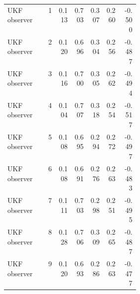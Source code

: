 \documentclass{article}
\begin{document}
\begin{center}
\begin{longtable}{p{0.31\linewidth}rrrrrr}
UKF observer & 1 & 0.113 & 0.703 & 0.307 & 0.260 & -0.500\\
UKF observer & 2 & 0.120 & 0.696 & 0.304 & 0.256 & -0.487\\
UKF observer & 3 & 0.116 & 0.700 & 0.305 & 0.262 & -0.494\\
UKF observer & 4 & 0.104 & 0.707 & 0.318 & 0.254 & -0.517\\
UKF observer & 5 & 0.108 & 0.695 & 0.294 & 0.272 & -0.497\\
UKF observer & 6 & 0.108 & 0.691 & 0.276 & 0.263 & -0.483\\
UKF observer & 7 & 0.111 & 0.703 & 0.298 & 0.251 & -0.495\\
UKF observer & 8 & 0.128 & 0.706 & 0.309 & 0.265 & -0.487\\
UKF observer & 9 & 0.120 & 0.693 & 0.286 & 0.263 & -0.477\\
\bottomrule
\end{longtable}
\normalsize
\end{center}
\end{document}
